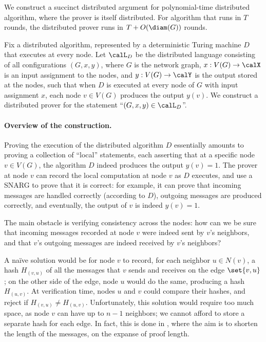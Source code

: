We construct a succinct distributed argument for polynomial-time distributed algorithm, where the prover is itself distributed. For algorithm that runs in $T$ rounds, the distributed prover runs in $T + O(\diam(G))$ rounds.

Fix a distributed algorithm, represented by a deterministic Turing machine $D$ that executes at every node.
Let $\calL_D$ be the distributed language consisting of all configurations $(G, x, y)$, where $G$ is the network graph, $x : V(G) \rightarrow \calX$ is an input assignment to the nodes, and $y : V(G) \rightarrow \calY$ is the output stored at the nodes, such that when $D$ is executed at every node of $G$ with input assignment $x$, each node $v \in V(G)$ produces the output $y(v)$. We construct a distributed prover for the statement ``$(G,x,y) \in \calL_D$''.


\paragraph{Overview of the construction.}
Proving the execution of the distributed algorithm $D$ essentially amounts to proving a collection of ``local'' statements, each asserting that at a specific node $v \in V(G)$, the algorithm $D$ indeed produces the output $y(v) = 1$. The prover at node $v$ can record the local computation at node $v$ as $D$ executes, and use a SNARG to prove that it is correct: for example, it can prove that incoming messages are handled correctly (according to $D$), outgoing messages are produced correctly, and eventually, the output of $v$ is indeed $y(v) = 1$.

The main obstacle is verifying consistency across the nodes: how can we be sure that incoming messages recorded at node $v$ were indeed sent by $v$'s neighbors, and that $v$'s outgoing messages are indeed received by $v$'s neighbors?

A na\"ive solution would be for node $v$ to record, for each neighbor $u \in N(v)$, a hash $H_{(v,u)}$ of all the messages that $v$ sends and receives on the edge $\set{v,u}$; on the other side of the edge, node $u$ would do the same, producing a hash $H_{(u,v)}$. At verification time, nodes $u$ and $v$ could compare their hashes, and reject if $H_{(v,u)} \neq H_{(u,v)}$. Unfortunately, this solution would require too much space, as node $v$ can have up to $n - 1$ neighbors; we cannot afford to store a separate hash for each edge. In fact, this is done in \cite{baruch2015randomized}, where the aim is to shorten the length of the messages, on the expanse of proof length.


